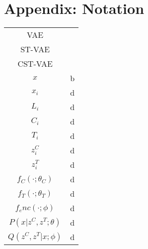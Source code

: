 
\section*{Appendix: Notation}


\begin{tabular}{cc}
VAE & \\
ST-VAE & \\
CST-VAE & \\
$x$ & b \\
 $x_i$ & d \\
  $L_i$ & d \\
   $C_i$ & d \\
   $T_i$ & d \\
$z^C_i$ & d \\
$z^T_i$ & d \\
$f_C(\cdot; \theta_C)$ & d \\
$f_T(\cdot; \theta_T)$ & d \\
$f_enc(\cdot ;\phi)$ & d \\
$P(x | z^C, z^T; \theta)$ & d \\
$Q(z^C, z^T | x; \phi)$ & d 
\end{tabular}

